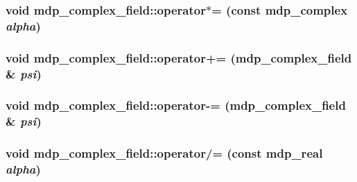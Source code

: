 \label{classmdp__complex__field_af890e25006822910f411ce10ba7dfc7a}
\hypertarget{classmdp__complex__field_a530256e46fe46c7422cbba8381891636}{
\subsubsection[{operator$\ast$=}]{\setlength{\rightskip}{0pt plus 5cm}void mdp\_\-complex\_\-field::operator$\ast$= (const {\bf mdp\_\-complex} {\em alpha})}}
\label{classmdp__complex__field_a530256e46fe46c7422cbba8381891636}
\hypertarget{classmdp__complex__field_a2278eac1ee19b8ca1c3c6b7319f6525d}{
\subsubsection[{operator+=}]{\setlength{\rightskip}{0pt plus 5cm}void mdp\_\-complex\_\-field::operator+= ({\bf mdp\_\-complex\_\-field} \& {\em psi})}}
\label{classmdp__complex__field_a2278eac1ee19b8ca1c3c6b7319f6525d}
\hypertarget{classmdp__complex__field_a0385e35ddfd532f15e817dcac1adf212}{
\subsubsection[{operator-\/=}]{\setlength{\rightskip}{0pt plus 5cm}void mdp\_\-complex\_\-field::operator-\/= ({\bf mdp\_\-complex\_\-field} \& {\em psi})}}
\label{classmdp__complex__field_a0385e35ddfd532f15e817dcac1adf212}
\hypertarget{classmdp__complex__field_a0d2bffa4819135c1ef77c0c9fb22504e}{
\subsubsection[{operator/=}]{\setlength{\rightskip}{0pt plus 5cm}void mdp\_\-complex\_\-field::operator/= (const {\bf mdp\_\-real} {\em alpha})}}
